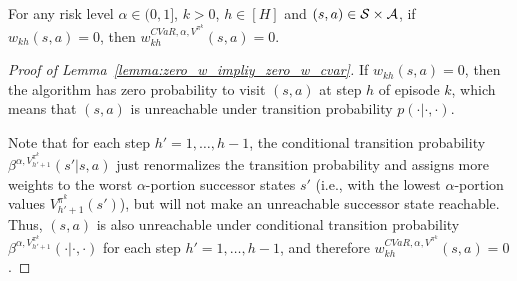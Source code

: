 \begin{lemma} \label{lemma:zero_w_impliy_zero_w_cvar}
	For any risk level $\alpha \in (0,1]$, $k>0$, $h \in [H]$ and $(s,a) \in \mathcal{S} \times \mathcal{A}$,
	if $w_{kh}(s,a)=0$, then $w_{kh}^{CVaR,\alpha,V^{\pi^k}}(s,a)=0$.
\end{lemma}
\begin{proof}[Proof of Lemma~\ref{lemma:zero_w_impliy_zero_w_cvar}]
	If $w_{kh}(s,a)=0$, then the algorithm has zero probability to visit $(s,a)$ at step $h$ of episode $k$, which means that $(s,a)$ is unreachable under transition probability $p(\cdot|\cdot,\cdot)$. 
	
	Note that for each step $h'=1,\dots,h-1$, the conditional transition probability $\beta^{\alpha,V_{h'+1}^{\pi^k}}(s'|s,a)$ just renormalizes the transition probability and assigns more weights to the worst $\alpha$-portion successor states $s'$ (i.e., with the lowest $\alpha$-portion values $V_{h'+1}^{\pi^k}(s')$), but will not make an unreachable successor state reachable. Thus, $(s,a)$ is also unreachable under conditional transition probability $\beta^{\alpha,V_{h'+1}^{\pi^k}}(\cdot|\cdot,\cdot)$ for each step $h'=1,\dots,h-1$, and therefore $w_{kh}^{CVaR,\alpha,V^{\pi^k}}(s,a)=0$.	
\end{proof}

